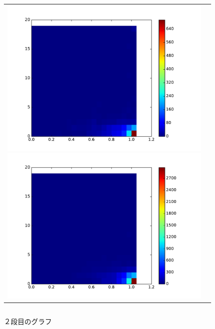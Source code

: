 \documentclass[a4paper,10pt,onecolumn,oneside,openany]{jsbook}
\begin{document}
\begin{figure}[h]
 \begin{tabular}{cc}
 	\begin{minipage}[t]{0.45\hsize}
	 \centering
	 \includegraphics[keepaspectratio, scale = 0.35]{colormap_splite_1.pdf}
	 \caption{１段目のグラフ}
	 \label{first_block}
	\end{minipage}
        \begin{minipage}[t]{0.45\hsize}
	 \centering
	 \includegraphics[keepaspectratio, scale = 0.35]{colormap_splite_2.pdf}
	 \caption{２段目のグラフ}
	 \label{second_block}
	\end{minipage}
 \end{tabular}
  \begin{tabular}{cc}

\end{tabular}
\end{figure}
\end{document}
